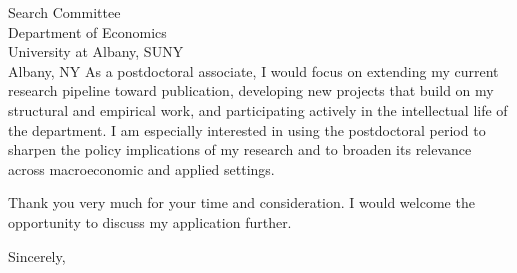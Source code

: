 \documentclass[11pt,letterpaper]{letter}
\begin{document}
\begin{letter}{Search Committee \\
Department of Economics \\
University at Albany, SUNY \\
Albany, NY}
As a postdoctoral associate, I would focus on extending my current research pipeline toward publication, developing new projects that build on my structural and empirical work, and participating actively in the intellectual life of the department. I am especially interested in using the postdoctoral period to sharpen the policy implications of my research and to broaden its relevance across macroeconomic and applied settings.

Thank you very much for your time and consideration. I would welcome the opportunity to discuss my application further.

\closing{Sincerely,}

\end{letter}
\end{document}
